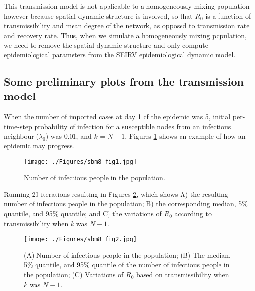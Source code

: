 \documentclass[a4paper]{article}
\begin{document}
	This transmission model is not applicable to a homogeneously mixing population however because spatial dynamic structure is involved, so that $R_0$ is a function of transmissibility and mean degree of the network, as opposed to transmission rate and recovery rate. Thus, when we simulate a homogeneously mixing population, we need to remove the spatial dynamic structure and only compute epidemiological parameters from the SEIRV epidemiological dynamic model.
	
	\subsection{Some preliminary plots from the transmission model}
	When the number of imported cases at day 1 of the epidemic was 5, initial per-time-step probability of infection for a susceptible nodes from an infectious neighbour ($\lambda_0$) was 0.01, and $k$ = $N-1$, Figures \ref{fig:seirv} shows an example of how an epidemic may progress.
	\begin{figure}[!ht]
		\begin{center}	
			\texttt{[image: ./Figures/sbm8\_fig1.jpg]} 
		\end{center}
		\caption[Number of infectious people in the population]{Number of infectious people in the population.}
		\label{fig:seirv}
	\end{figure}
	
	Running 20 iterations resulting in Figures \ref{fig:transmodel1}, which shows A) the resulting number of infectious people in the population; B) the corresponding median, 5\% quantile, and 95\% quantile; and C) the variations of $R_0$ according to transmissibility when $k$ was $N-1$. 	    
	\begin{figure}[!ht]
		\begin{center}	
			\texttt{[image: ./Figures/sbm8\_fig2.jpg]} 
		\end{center}
		\caption[Number of infectious people in the population]{(A) Number of infectious people in the population; (B) The median, 5\% quantile, and 95\% quantile of the number of infectious people in the population; (C) Variations of $R_0$ based on transmissibility when $k$ was $N-1$.}
		\label{fig:transmodel1}
	\end{figure}
	
	\newpage
\end{document}
